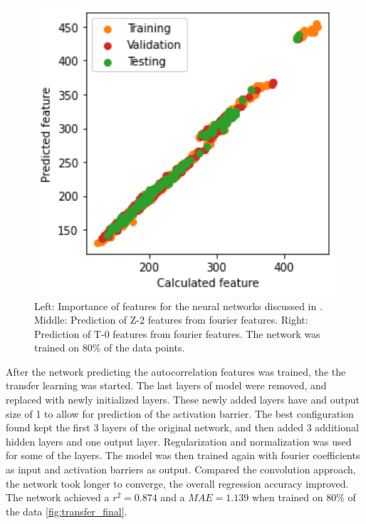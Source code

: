 \begin{figure}[!htb]
      \includegraphics[width=1.0\textwidth]{figures/regression/fourier/transfer/scatterT0.png}
    \endminipage
    \caption{
    Left: Importance of features for the neural networks discussed in \cite{friederich_dos}.
    Middle: Prediction of Z-2 features from fourier features.
    Right: Prediction of T-0 features from fourier features. 
    The network was trained on 80\% of the data points.
    }
    \label{fig:transfer_result}
\end{figure}

After the network predicting the autocorrelation features was trained, the the transfer learning was started.
The last layers of model were removed, and replaced with newly initialized layers.
These newly added layers have and output size of 1 to allow for prediction of the activation barrier.
The best configuration found kept the first 3 layers of the original network, and then added 3 additional hidden layers and one output layer.
Regularization and normalization was used for some of the layers.
The model was then trained again with fourier coefficients as input and activation barriers as output.
Compared the convolution approach, the network took longer to converge, the overall regression accuracy improved.
The network achieved a $r^2=0.874$ and a $MAE=1.139$ when trained on 80\% of the data \ref{fig:transfer_final}.

